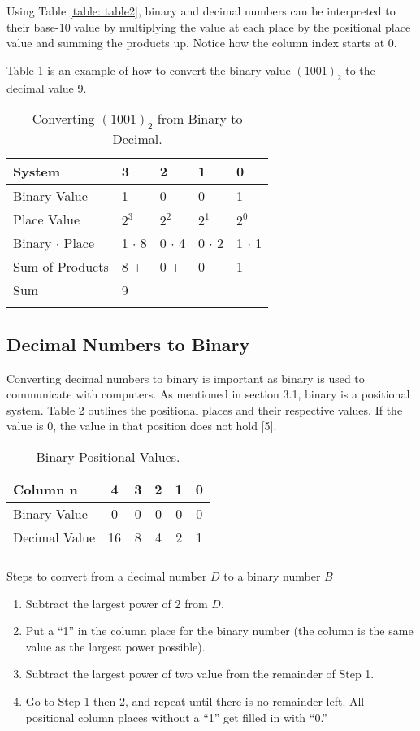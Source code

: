 \documentclass[twocolumn, 10pt]{article}
\begin{document}
Using Table \ref{table: table2}, binary and decimal numbers can be interpreted to their base-10 value by multiplying the value at each place by the positional place value and summing the products up. Notice how the column index starts at 0. 

Table \ref{table: table3} is an example of how to convert the binary value $(1001)_{2}$ to the decimal value 9. 
\begin{table}[ht]
\centering
\caption{Converting $(1001)_{2}$ from Binary to Decimal.}
\begin{tabular}[t]{lllll}
\hline
System&3&2&1&0\\
\hline
Binary Value&1&0&0&1\\
Place Value &$2^{3}$&$2^{2}$&$2^{1}$&$2^{0}$\\
Binary $\cdot$ Place & 1 $\cdot$ 8&0 $\cdot$ 4& 0 $\cdot$ 2 & 1 $\cdot$ 1\\ 
Sum of Products& 8 + & 0 + & 0 + & 1\\
Sum & 9\\
\hline
\label{table: table3}
\end{tabular}
\end{table}%





\subsection{Decimal Numbers to Binary}
Converting decimal numbers to binary is important as binary is used to communicate with computers. As mentioned in section 3.1, binary is a positional system. Table \ref{table: table4} outlines the positional places and their respective values. If the value is 0, the value in that position does not hold [5]. 

\begin{table}[ht]
\centering
\caption{Binary Positional Values.}
\begin{tabular}[t]{lccccc}
\hline
Column n&4&3&2&1&0\\
\hline
Binary Value&0&0&0&0&0\\
Decimal Value &16&8&4&2&1\\

\hline
\label{table: table4}
\end{tabular}
\end{table}%

Steps to convert from a decimal number $D$ to a binary number $B$
\begin{enumerate}
  \item Subtract the largest power of 2 from $D$.
  \item Put a “1” in the column place for the binary number (the column is the same value as the largest power possible).
  \item Subtract the largest power of two value from the remainder of Step 1. 
  \item Go to Step 1 then 2, and repeat until there is no remainder left. All positional column places without a “1” get filled in with “0.”
\end{enumerate}
\end{document}
